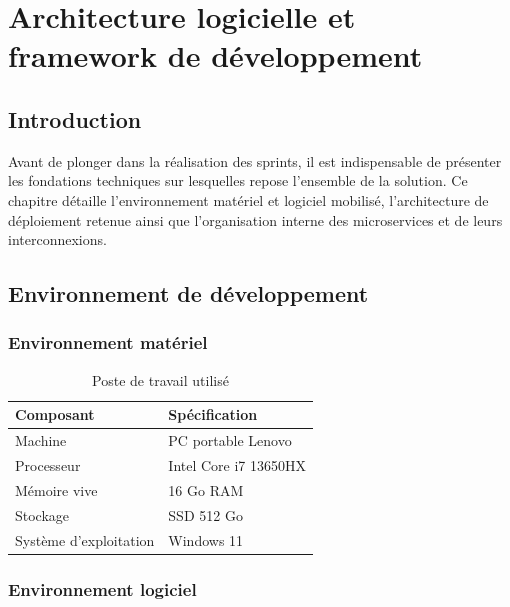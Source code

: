\chapter{Architecture logicielle et framework de développement}

\section{Introduction}

Avant de plonger dans la réalisation des sprints, il est indispensable de présenter les fondations techniques sur lesquelles repose l'ensemble de la solution. Ce chapitre détaille l'environnement matériel et logiciel mobilisé, l'architecture de déploiement retenue ainsi que l'organisation interne des microservices et de leurs interconnexions.

\section{Environnement de développement}

\subsection{Environnement matériel}

\begin{table}[H]
    \centering
    \caption{Poste de travail utilisé}
    \label{tab:env_materiel}
    \begin{tabular}{|l|l|}
        \hline
        \textbf{Composant} & \textbf{Spécification} \\
        \hline
        Machine & PC portable Lenovo \\
        \hline
        Processeur & Intel Core i7 13650HX \\
        \hline
        Mémoire vive & 16 Go RAM \\
        \hline
        Stockage & SSD 512 Go \\
        \hline
        Système d'exploitation & Windows 11  \\
        \hline
    \end{tabular}
\end{table}

\subsection{Environnement logiciel}

